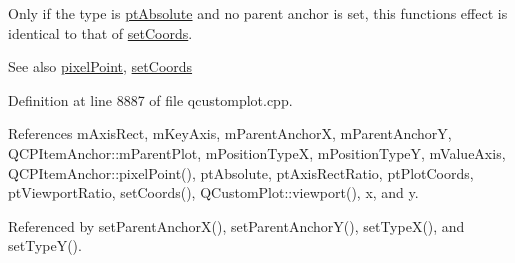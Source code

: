 Only if the type is \hyperlink{class_q_c_p_item_position_aad9936c22bf43e3d358552f6e86dbdc8a564f5e53e550ead1ec5fc7fc7d0b73e0}{pt\+Absolute} and no parent anchor is set, this function\textquotesingle{}s effect is identical to that of \hyperlink{class_q_c_p_item_position_aa988ba4e87ab684c9021017dcaba945f}{set\+Coords}.

\begin{DoxySeeAlso}{See also}
\hyperlink{class_q_c_p_item_position_ae490f9c76ee2ba33752c495d3b6e8fb5}{pixel\+Point}, \hyperlink{class_q_c_p_item_position_aa988ba4e87ab684c9021017dcaba945f}{set\+Coords} 
\end{DoxySeeAlso}


Definition at line 8887 of file qcustomplot.\+cpp.



References m\+Axis\+Rect, m\+Key\+Axis, m\+Parent\+Anchor\+X, m\+Parent\+Anchor\+Y, Q\+C\+P\+Item\+Anchor\+::m\+Parent\+Plot, m\+Position\+Type\+X, m\+Position\+Type\+Y, m\+Value\+Axis, Q\+C\+P\+Item\+Anchor\+::pixel\+Point(), pt\+Absolute, pt\+Axis\+Rect\+Ratio, pt\+Plot\+Coords, pt\+Viewport\+Ratio, set\+Coords(), Q\+Custom\+Plot\+::viewport(), x, and y.



Referenced by set\+Parent\+Anchor\+X(), set\+Parent\+Anchor\+Y(), set\+Type\+X(), and set\+Type\+Y().


